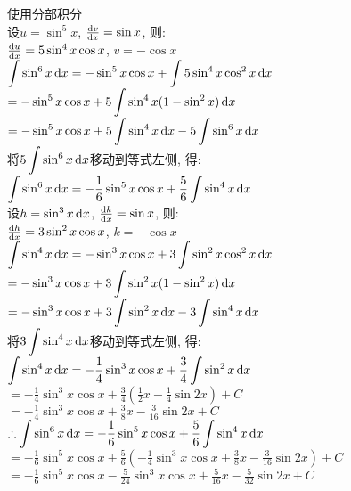 使用分部积分\\
设$u=\sin^5x$, $\frac{\mathop{}\!\mathrm{d} v}{\mathop{}\!\mathrm{d} x}=\sin x$, 则:\\
\phantom{设}$\frac{\mathop{}\!\mathrm{d} u}{\mathop{}\!\mathrm{d} x}=5\sin^4x\cos x$, $v=-\cos x$\\
$\displaystyle\int\sin^6x\mathop{}\!\mathrm{d} x=-\sin^5x\cos x+\int5\sin^4x\cos^2x\mathop{}\!\mathrm{d} x$\\
\phantom{$\displaystyle\int\sin^6x\dif x$}$\displaystyle=-\sin^5x\cos x+5\int\sin^4x(1-\sin^2x)\mathop{}\!\mathrm{d} x$\\
\phantom{$\displaystyle\int\sin^6x\dif x$}$\displaystyle=-\sin^5x\cos x+5\int\sin^4x\mathop{}\!\mathrm{d} x-5\int\sin^6x\mathop{}\!\mathrm{d} x$\\
将$\displaystyle5\int\sin^6x\mathop{}\!\mathrm{d} x$移动到等式左侧, 得:\\
$\displaystyle\int\sin^6x\mathop{}\!\mathrm{d} x=-\frac{1}{6}\sin^5x\cos x+\frac{5}{6}\int\sin^4x\mathop{}\!\mathrm{d} x$\\
设$h=\sin^3x\mathop{}\!\mathrm{d} x$, $\frac{\mathop{}\!\mathrm{d} k}{\mathop{}\!\mathrm{d} x}=\sin x$, 则:\\
\phantom{设}$\frac{\mathop{}\!\mathrm{d} h}{\mathop{}\!\mathrm{d} x}=3\sin^2x\cos x$, $k=-\cos x$\\
$\displaystyle\int\sin^4x\mathop{}\!\mathrm{d} x=-\sin^3x\cos x+3\int\sin^2x\cos^2x\mathop{}\!\mathrm{d} x$\\
\phantom{$\displaystyle\int\sin^4x\dif x$}$\displaystyle=-\sin^3x\cos x+3\int\sin^2x(1-\sin^2x)\mathop{}\!\mathrm{d} x$\\
\phantom{$\displaystyle\int\sin^4x\dif x$}$\displaystyle=-\sin^3x\cos x+3\int\sin^2x\mathop{}\!\mathrm{d} x-3\int\sin^4x\mathop{}\!\mathrm{d} x$\\
将$\displaystyle3\int\sin^4x\mathop{}\!\mathrm{d} x$移动到等式左侧, 得:\\
$\displaystyle\int\sin^4x\mathop{}\!\mathrm{d} x=-\frac{1}{4}\sin^3x\cos x+\frac{3}{4}\int\sin^2x\mathop{}\!\mathrm{d} x$\\
\phantom{$\displaystyle\int\sin^4x\dif x$}$\displaystyle=-\frac{1}{4}\sin^3x\cos x+\frac{3}{4}(\frac{1}{2}x-\frac{1}{4}\sin2x)+C$\\
\phantom{$\displaystyle\int\sin^4x\dif x$}$\displaystyle=-\frac{1}{4}\sin^3x\cos x+\frac{3}{8}x-\frac{3}{16}\sin2x+C$\\
$\displaystyle\therefore\int\sin^6x\mathop{}\!\mathrm{d} x=-\frac{1}{6}\sin^5x\cos x+\frac{5}{6}\int\sin^4x\mathop{}\!\mathrm{d} x$\\
\phantom{$\displaystyle\therefore\int\sin^6x\dif x$}$\displaystyle=-\frac{1}{6}\sin^5x\cos x+\frac{5}{6}(-\frac{1}{4}\sin^3x\cos x+\frac{3}{8}x-\frac{3}{16}\sin2x)+C$\\
\phantom{$\displaystyle\therefore\int\sin^6x\dif x$}$\displaystyle=-\frac{1}{6}\sin^5x\cos x-\frac{5}{24}\sin^3x\cos x+\frac{5}{16}x-\frac{5}{32}\sin2x+C$\\

